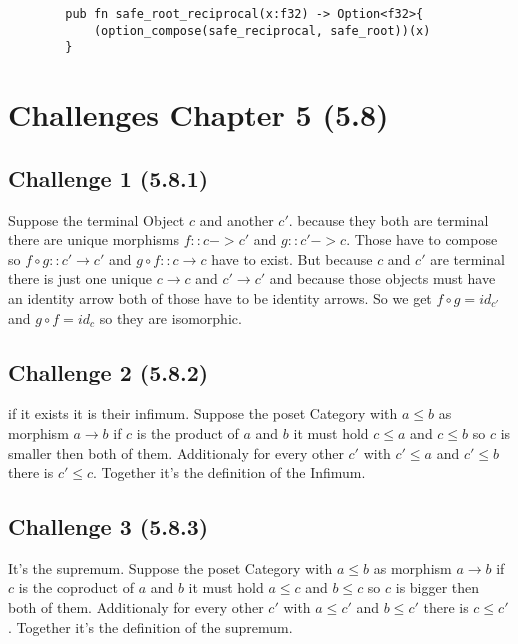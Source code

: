 \documentclass[11pt]{article}
\begin{document}
    \begin{verbatim}
        pub fn safe_root_reciprocal(x:f32) -> Option<f32>{
            (option_compose(safe_reciprocal, safe_root))(x)
        }
    \end{verbatim}

\section*{Challenges Chapter 5 (5.8)}
    \subsection*{Challenge 1 (5.8.1)}
        Suppose the terminal Object $c$ and another $c'$. because they both are terminal there are unique morphisms $f :: c -> c'$ and $g :: c' -> c$. Those have to compose so $f \circ g :: c' \rightarrow c'$ and $g \circ f :: c \rightarrow c$ have to exist. But because $c$ and $c'$ are terminal there is just one unique $c \rightarrow c$ and $c' \rightarrow c'$ and because those objects must have an identity arrow both of those have to be identity arrows. So we get $f \circ g = id_{c'}$ and $g \circ f = id_c$ so they are isomorphic.

    \subsection*{Challenge 2 (5.8.2)}
        if it exists it is their infimum. Suppose the poset Category with $a \leq b$ as morphism $a \rightarrow b$ if $c$ is the product of $a$ and $b$ it must hold $c \leq a$ and $c \leq b$ so $c$ is smaller then both of them. Additionaly for every other $c'$ with $c' \leq a$ and $c' \leq b$ there is $c' \leq c$. Together it's the definition of the Infimum.

    \subsection*{Challenge 3 (5.8.3)}
        It's the supremum. Suppose the poset Category with $a \leq b$ as morphism $a \rightarrow b$ if $c$ is the coproduct of $a$ and $b$ it must hold $a \leq c$ and $b \leq c$ so $c$ is bigger then both of them. Additionaly for every other $c'$ with $a \leq c'$ and $b \leq c'$ there is $c \leq c'$. Together it's the definition of the supremum. 
\end{document}
